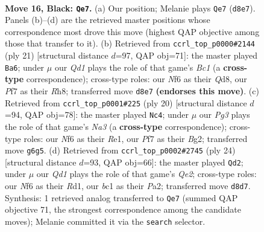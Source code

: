 \documentclass[11pt]{article}
\begin{document}
\clearpage

\begin{figure}[p]\centering
\begin{subfigure}{0.46\textwidth}\centering
\resizebox{\linewidth}{!}{%
\newchessgame
\chessboard[
  setfen={rnbqr1k1/pp3pb1/4pnp1/1Q1p3p/P2P4/1B3NPP/RPP2P2/1NB1R1K1 b - - 1 16},
  showmover=false,
  pgfstyle=straightmove, color=movearrow, markmove={d8-e7}
]}
\caption{}
\end{subfigure}\hfill
\begin{subfigure}{0.46\textwidth}\centering
\resizebox{\linewidth}{!}{%
\newchessgame
\chessboard[
  setfen={r1bqk2r/p2pppbp/1p2n1p1/3Q4/2P1P3/2N1B3/PP3PPP/2R1KB1R b Kkq - 1 11},
  showmover=false,
  pgfstyle=straightmove, color=movearrow, markmove={c8-a6}
]}
\caption{}
\end{subfigure}
\\[4pt]
\begin{subfigure}{0.46\textwidth}\centering
\resizebox{\linewidth}{!}{%
\newchessgame
\chessboard[
  setfen={r1b2rk1/pp2bppp/2n1p3/2p2n2/8/NPPq1NP1/P2P1PBP/R1BQR1K1 w - - 1 11},
  showmover=false,
  pgfstyle=straightmove, color=movearrow, markmove={a3-c4}
]}
\caption{}
\end{subfigure}\hfill
\begin{subfigure}{0.46\textwidth}\centering
\resizebox{\linewidth}{!}{%
\newchessgame
\chessboard[
  setfen={rnb1k1r1/2p1bp1p/p3p3/3q1p2/Np1P4/1P3N2/P1P1QPPP/2KR1B1R w q - 1 13},
  showmover=false,
  pgfstyle=straightmove, color=movearrow, markmove={e2-d2}
]}
\caption{}
\end{subfigure}
\caption{\textbf{Move 16, Black: \texttt{Qe7}.} (a) Our position; Melanie plays \texttt{Qe7} (\texttt{d8e7}). Panels (b)--(d) are the retrieved master positions whose correspondence most drove this move (highest QAP objective among those that transfer to it). (b) Retrieved from \texttt{ccrl\_top\_p0000\#2144} (ply 21) [structural distance $d$=97, QAP obj=71]: the master played \texttt{Ba6}; under $\mu$ our \emph{Qd1} plays the role of that game's \emph{Bc1} (a \textbf{cross-type} correspondence); cross-type roles: our \emph{N}f6 as their \emph{Q}d8, our \emph{P}f7 as their \emph{R}h8; transferred move \texttt{d8e7} \textbf{(endorses this move)}. (c) Retrieved from \texttt{ccrl\_top\_p0001\#225} (ply 20) [structural distance $d$=94, QAP obj=78]: the master played \texttt{Nc4}; under $\mu$ our \emph{Pg3} plays the role of that game's \emph{Na3} (a \textbf{cross-type} correspondence); cross-type roles: our \emph{N}f6 as their \emph{R}e1, our \emph{P}f7 as their \emph{B}g2; transferred move \texttt{g6g5}. (d) Retrieved from \texttt{ccrl\_top\_p0002\#2745} (ply 24) [structural distance $d$=93, QAP obj=66]: the master played \texttt{Qd2}; under $\mu$ our \emph{Qd1} plays the role of that game's \emph{Qe2}; cross-type roles: our \emph{N}f6 as their \emph{R}d1, our \emph{b}c1 as their \emph{P}a2; transferred move \texttt{d8d7}. Synthesis: 1 retrieved analog transferred to \texttt{Qe7} (summed QAP objective 71, the strongest correspondence among the candidate moves); Melanie committed it via the \texttt{search} selector.}
\label{fig:thought-m31}
\end{figure}
\end{document}
